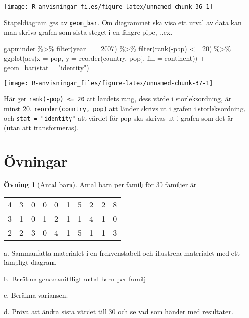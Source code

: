 \documentclass[
]{book}
\newenvironment{Shaded}{\begin{snugshade}}{\end{snugshade}}
\newcommand{\AttributeTok}[1]{\textcolor[rgb]{0.77,0.63,0.00}{#1}}
\newcommand{\DecValTok}[1]{\textcolor[rgb]{0.00,0.00,0.81}{#1}}
\newcommand{\FunctionTok}[1]{\textcolor[rgb]{0.00,0.00,0.00}{#1}}
\newcommand{\NormalTok}[1]{#1}
\newcommand{\SpecialCharTok}[1]{\textcolor[rgb]{0.00,0.00,0.00}{#1}}
\newcommand{\StringTok}[1]{\textcolor[rgb]{0.31,0.60,0.02}{#1}}
\theoremstyle{definition}
\theoremstyle{definition}
\theoremstyle{definition}
\newtheorem{exercise}{Övning}[chapter]
\theoremstyle{definition}
\theoremstyle{remark}
\begin{document}
\begin{center}\texttt{[image: R-anvisningar\_files/figure-latex/unnamed-chunk-36-1]} \end{center}

Stapeldiagram ges av \texttt{geom\_bar}. Om diagrammet ska visa ett urval av data kan man skriva grafen som sista steget i en längre pipe, t.ex.

\begin{Shaded}
\begin{Highlighting}[]
\NormalTok{gapminder }\SpecialCharTok{\%\textgreater{}\%} 
  \FunctionTok{filter}\NormalTok{(year }\SpecialCharTok{==} \DecValTok{2007}\NormalTok{) }\SpecialCharTok{\%\textgreater{}\%} 
  \FunctionTok{filter}\NormalTok{(}\FunctionTok{rank}\NormalTok{(}\SpecialCharTok{{-}}\NormalTok{pop) }\SpecialCharTok{\textless{}=} \DecValTok{20}\NormalTok{) }\SpecialCharTok{\%\textgreater{}\%} 
  \FunctionTok{ggplot}\NormalTok{(}\FunctionTok{aes}\NormalTok{(}\AttributeTok{x =}\NormalTok{ pop, }\AttributeTok{y =} \FunctionTok{reorder}\NormalTok{(country, pop), }\AttributeTok{fill =}\NormalTok{ continent)) }\SpecialCharTok{+}
  \FunctionTok{geom\_bar}\NormalTok{(}\AttributeTok{stat =} \StringTok{"identity"}\NormalTok{)}
\end{Highlighting}
\end{Shaded}

\begin{center}\texttt{[image: R-anvisningar\_files/figure-latex/unnamed-chunk-37-1]} \end{center}

Här ger \texttt{rank(-pop)\ \textless{}=\ 20} att landets rang, dess värde i storleksordning, är minst 20, \texttt{reorder(country,\ pop)} att länder skrivs ut i grafen i storleksordning, och \texttt{stat\ =\ "identity"} att värdet för pop ska skrivas ut i grafen som det är (utan att transformeras).

\hypertarget{uxf6vningar}{%
\section{Övningar}\label{uxf6vningar}}

\begin{exercise}[Antal barn]
Antal barn per familj för 30 familjer är

\begin{table}
\centering
\begin{tabular}[t]{rrrrrrrrrr}
\toprule
4 & 3 & 0 & 0 & 0 & 1 & 5 & 2 & 2 & 8\\
3 & 1 & 0 & 1 & 2 & 1 & 1 & 4 & 1 & 0\\
2 & 2 & 3 & 0 & 4 & 1 & 5 & 1 & 1 & 3\\
\bottomrule
\end{tabular}
\end{table}

a. Sammanfatta materialet i en frekvenstabell och illustrera materialet med ett lämpligt diagram.

b. Beräkna genomsnittligt antal barn per familj.

c. Beräkna variansen.

d. Pröva att ändra sista värdet till 30 och se vad som händer med resultaten.
\end{exercise}
\end{document}
